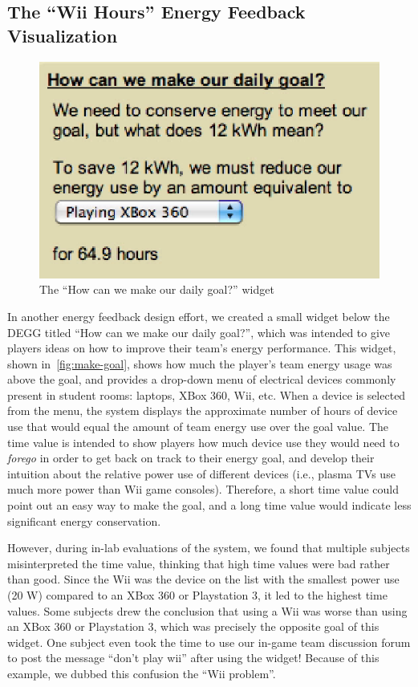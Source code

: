 \documentclass[10pt, conference, compsocconf]{IEEEtran-old}
\begin{document}
\subsection{The ``Wii Hours'' Energy Feedback Visualization}

\begin{figure}[!tb]
	\centering
	\includegraphics[width=0.9\columnwidth]{how-meet-goal.eps}
	\caption{The ``How can we make our daily goal?'' widget}
	\label{fig:make-goal}
\end{figure}

In another energy feedback design effort, we created a small widget below the DEGG titled ``How can we make our daily goal?'', which was intended to give players ideas on how to improve their team's energy performance. This widget, shown in~\autoref{fig:make-goal}, shows how much the player's team energy usage was above the goal, and provides a drop-down menu of electrical devices commonly present in student rooms: laptops, XBox 360, Wii, etc. When a device is selected from the menu, the system displays the approximate number of hours of device use that would equal the amount of team energy use over the goal value. The time value is intended to show players how much device use they would need to \emph{forego} in order to get back on track to their energy goal, and develop their intuition about the relative power use of different devices (i.e., plasma TVs use much more power than Wii game consoles). Therefore, a short time value could point out an easy way to make the goal, and a long time value would indicate less significant energy conservation.

However, during in-lab evaluations of the system, we found that multiple subjects misinterpreted the time value, thinking that high time values were bad rather than good. Since the Wii was the device on the list with the smallest power use (20 W) compared to an XBox 360 or Playstation 3, it led to the highest time values. Some subjects drew the conclusion that using a Wii was worse than using an XBox 360 or Playstation 3, which was precisely the opposite goal of this widget. One subject even took the time to use our in-game team discussion forum to post the message ``don't play wii'' after using the widget! Because of this example, we dubbed this confusion the ``Wii problem''.
\end{document}
